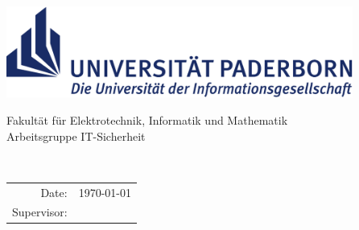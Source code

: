 
\begin{titlepage}
	\centering
	\begin{minipage}{14cm}		
		\hspace*{1.9cm}
		\includegraphics[height=3cm]{figures/upb_logo}\\
		\hspace*{4cm}
		\begin{minipage}{9.5cm}
			\vspace*{5pt}
			\textsf{\noindent
				Fakultät für Elektrotechnik, Informatik und Mathematik\\
				Arbeitsgruppe IT-Sicherheit
			}
		\end{minipage}		
	\end{minipage}\\[50pt]
	{\Large\bfseries \Type\par}
	\vspace{1.5cm}
	{\huge\sffamily\bfseries{\Title}\par}
	\vspace{2cm}
	{\Large \Author\par}
	\vfill
	\begin{tabular}{r l}
		Date:    & \today \: & \Supervisor\\
	\end{tabular}
	\vfill
\end{titlepage}